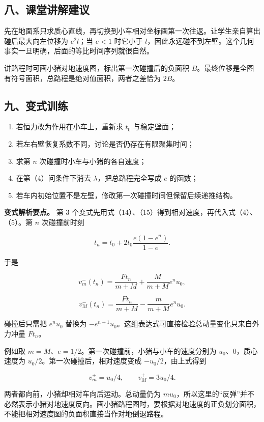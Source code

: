 \documentclass[12pt,a4paper,UTF8]{ctexart}
\newcommand{\tightlist}{\setlength{\itemsep}{0pt}\setlength{\parskip}{0pt}}
\begin{document}
\subsection{八、课堂讲解建议}\label{ux516bux8bfeux5802ux8bb2ux89e3ux5efaux8bae}

先在地面系只求质心直线，再切换到小车相对坐标画第一次往返。让学生亲自算出碰后最大向左位移为
\(e^2l\)；当 \(e<1\) 时它小于
\(l\)，因此永远碰不到左壁。这个几何事实一旦明确，后面的等比时间序列就很自然。

讲路程时可画小猪对地速度图，标出第一次碰撞后的负面积
\(B\)。最终位移是全图有符号面积，总路程是绝对值面积，两者之差恰为
\(2B\)。

\subsection{九、变式训练}\label{ux4e5dux53d8ux5f0fux8badux7ec3}

\begin{enumerate}
\def\labelenumi{\arabic{enumi}.}
\tightlist
\item
  若恒力改为作用在小车上，重新求 \(t_0\) 与稳定壁面；
\item
  若左右壁恢复系数不同，讨论是否仍存在有限聚集时间；
\item
  求第 \(n\) 次碰撞时小车与小猪的各自速度；
\item
  在第（4）问条件下消去 \(\lambda\)，把总路程完全写成 \(e\) 的函数；
\item
  若车内初始位置不是左壁，修改第一次碰撞时间但保留后续递推结构。
\end{enumerate}

\textbf{变式解析要点。} 第 3
个变式先用式（14）、（15）得到相对速度，再代入式（4）、（5）。第 \(n\)
次碰撞前时刻

\[
t_n=t_0+2t_0\frac{e(1-e^n)}{1-e}.
\]

于是

\[
v_m^-(t_n)
=\frac{Ft_n}{m+M}
+\frac{M}{m+M}e^nu_0,
\]

\[
v_M^-(t_n)
=\frac{Ft_n}{m+M}
-\frac{m}{m+M}e^nu_0.
\]

碰撞后只需把 \(e^nu_0\) 替换为
\(-e^{n+1}u_0\)。这组表达式可直接检验总动量变化只来自外力冲量 \(Ft_n\)。

例如取 \(m=M\)、\(e=1/2\)。第一次碰撞前，小猪与小车的速度分别为
\(u_0\)、\(0\)，质心速度为 \(u_0/2\)。第一次碰撞后，相对速度变成
\(-u_0/2\)，由上式得到

\[v_m^+=u_0/4,\qquad v_M^+=3u_0/4.\]

两者都向前，小猪却相对车向后运动。总动量仍为
\(mu_0\)，所以这里的``反弹''并不必然表示小猪对地速度反向。画小猪路程图时，要根据对地速度的正负划分面积，不能把相对速度图的负面积直接当作对地倒退路程。
\end{document}
